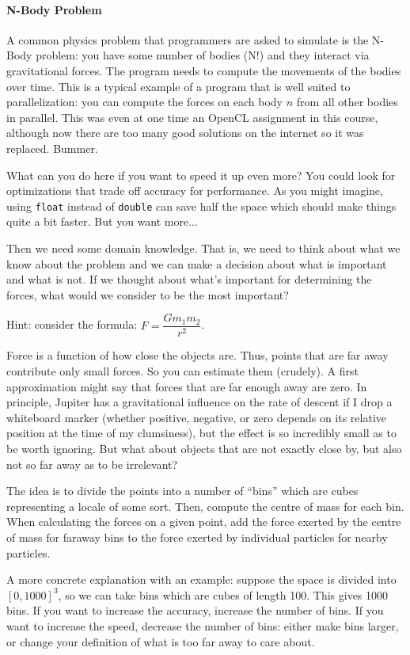 \documentclass[a4paper]{report}
\begin{document}
\paragraph{N-Body Problem}
A common physics problem that programmers are asked to simulate is the N-Body problem: you have some number of bodies (N!) and they interact via gravitational forces. The program needs to compute the movements of the bodies over time. This is a typical example of a program that is well suited to parallelization: you can compute the forces on each body $n$ from all other bodies in parallel. This was even at one time an OpenCL assignment in this course, although now there are too many good solutions on the internet so it was replaced. Bummer.

What can you do here if you want to speed it up even more? You could look for optimizations that trade off accuracy for performance. As you might imagine, using \texttt{float} instead of \texttt{double} can save half the space which should make things quite a bit faster. But you want more...

Then we need some domain knowledge. That is, we need to think about what we know about the problem and we can make a decision about what is important and what is not. If we thought about what's important for determining the forces, what would we consider to be the most important? 

Hint: consider the formula: $F = \dfrac{Gm_{1}m_{2}}{r^{2}}$. 

Force is a function of how close the objects are. Thus, points that are far away contribute only small forces. So you can estimate them (crudely). A first approximation might say that forces that are far enough away are zero. In principle, Jupiter has a gravitational influence on the rate of descent if I drop a whiteboard marker (whether positive, negative, or zero depends on its relative position at the time of my clumsiness), but the effect is so incredibly small as to be worth ignoring. But what about objects that are not exactly close by, but also not so far away as to be irrelevant?

The idea is to divide the points into a number of ``bins'' which are cubes representing a locale of some sort. Then, compute the centre of mass for each bin. When calculating the forces on a given point, add the force exerted by the centre of mass for faraway bins to the force exerted by individual particles for nearby particles.

A more concrete explanation with an example: suppose the space  is divided into $[0, 1000]^3$, so we can take bins which are cubes of length 100. This gives 1000 bins. If you want to increase the accuracy, increase the number of bins. If you want to increase the speed, decrease the number of bins: either make bins larger, or change your definition of what is too far away to care about.
\end{document}
